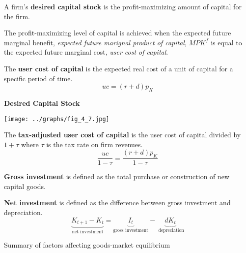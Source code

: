 \documentclass[letterpaper, 9pt,landscape]{extarticle}
\begin{document}
\begin{multicols*}{5}
\begin{remark}
\end{remark}

\begin{definition}
    A firm's \textbf{desired capital stock} is the profit-maximizing amount of capital for the firm.
\end{definition}

\begin{remark}
    The profit-maximizing level of capital is achieved when the expected future marginal benefit, \textit{expected future marignal product of capital}, $MPK^f$ is equal to the expected future marginal cost, \textit{user cost of capital}.
\end{remark}

\begin{definition}
    The \textbf{user cost of capital} is the expected real cost of a unit of capital for a specific period of time.  
    \[
        uc = (r + d) p_K
    \]
\end{definition}

\begin{remark}
    \textbf{Desired Capital Stock}
    \begin{center}
    \texttt{[image: ../graphs/fig\_4\_7.jpg]}
    \end{center}
\end{remark}

\begin{definition}
    The \textbf{tax-adjusted user cost of capital} is the user cost of capital divided by $1 + \tau$ where $\tau$ is the tax rate on firm revenues. \\
    \[
        \frac{uc}{1 - \tau} = \frac{(r + d)p_K}{1 - \tau}
    \]
\end{definition}

\begin{definition}
    \textbf{Gross investment} is defined as the total purchase or construction of new capital goods. 
\end{definition}

\begin{definition}
    \textbf{Net investment} is defined as the difference between gross investment and depreciation.
    \[
    \underbrace{K_{t + 1} - K_t}_{\text{net investment}} = \underbrace{I_t}_{\text{gross investment}} - \underbrace{dK_t}_{ \text{ depreciation}}
    \]
\end{definition}

\begin{remark}
    Summary of factors affecting goods-market equilibrium  \\


\end{remark}
\end{multicols*}
\end{document}
